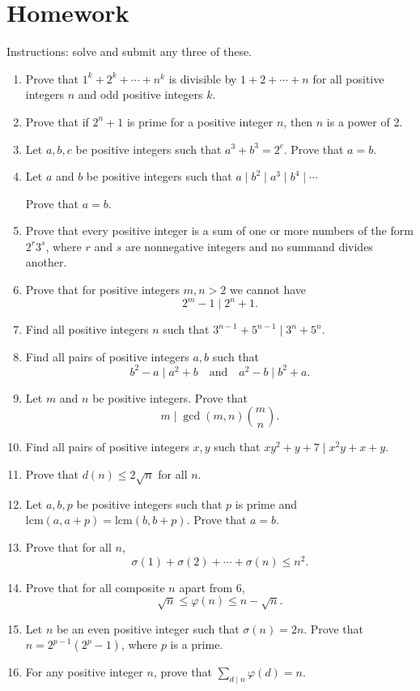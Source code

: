 \documentclass{article}
\newcommand\lcm{\mathrm{lcm}}
\begin{document}
\section{Homework}
Instructions: solve and submit any three of these.
\begin{enumerate}
  \item Prove that $1^k+2^k+\cdots+n^k$ is divisible by $1+2+\cdots+n$ for
    all positive integers $n$ and odd positive integers $k$.
  \item Prove that if $2^n+1$ is prime for a positive integer $n$, then $n$ is
    a power of 2.
  \item Let $a,b,c$ be positive integers such that $a^3+b^3=2^c$. Prove that
    $a=b$.
  \item Let $a$ and $b$ be positive integers such that $a\mid b^2\mid a^3\mid
    b^4\mid\cdots$

    Prove that $a=b$.
  \item Prove that every positive integer is a sum of one or more numbers of
    the form $2^r3^s$, where $r$ and $s$ are nonnegative integers and no
    summand divides another.
  \item Prove that for positive integers $m,n>2$ we cannot have \[2^m-1\mid
      2^n+1.\]
  \item Find all positive integers $n$ such that $3^{n-1}+5^{n-1}\mid
    3^n+5^n$.
  \item Find all pairs of positive integers $a,b$ such that \[b^2-a\mid
      a^2+b\quad\text{and}\quad a^2-b\mid b^2+a.\]
  \item Let $m$ and $n$ be positive integers. Prove that
    \[m\mid\gcd(m,n)\binom mn.\]
  \item Find all pairs of positive integers $x,y$ such that $xy^2+y+7\mid
    x^2y+x+y$.
  \item Prove that $d(n)\le 2\sqrt n$ for all $n$.
  \item Let $a,b,p$ be positive integers such that $p$ is prime and
    $\lcm(a,a+p)=\lcm(b,b+p)$. Prove that $a=b$.
  \item Prove that for all $n$,
    \[\sigma(1)+\sigma(2)+\cdots+\sigma(n)\le n^2.\]
  \item Prove that for all composite $n$ apart from 6,
    \[\sqrt n\le\varphi(n)\le n-\sqrt n.\]
  \item Let $n$ be an even positive integer such that $\sigma(n)=2n$. Prove that
    $n=2^{p-1}\left(2^p-1\right)$, where $p$ is a prime.
  \item For any positive integer $n$, prove that $\displaystyle\sum_{d\mid
    n}\varphi(d)=n$.
\end{enumerate}
\end{document}
